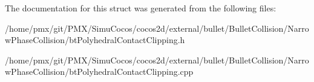 The documentation for this struct was generated from the following files\+:\begin{DoxyCompactItemize}
\item 
/home/pmx/git/\+P\+M\+X/\+Simu\+Cocos/cocos2d/external/bullet/\+Bullet\+Collision/\+Narrow\+Phase\+Collision/bt\+Polyhedral\+Contact\+Clipping.\+h\item 
/home/pmx/git/\+P\+M\+X/\+Simu\+Cocos/cocos2d/external/bullet/\+Bullet\+Collision/\+Narrow\+Phase\+Collision/bt\+Polyhedral\+Contact\+Clipping.\+cpp\end{DoxyCompactItemize}
